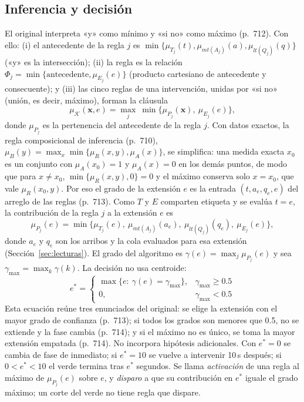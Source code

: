 \documentclass[journal]{IEEEtran}
\begin{document}
\subsection{Inferencia y decisión}
\label{ap:inferencia}
El original interpreta «y» como mínimo y «si no» como máximo (p.~712). Con ello: (i) el antecedente de la regla $j$ es $\min\{\mu_{T_j}(t),\mu_{mt(A_j)}(a),\mu_{lt(Q_j)}(q)\}$ («y» es la intersección); (ii) la regla es la relación $\Phi_j=\min\{\text{antecedente},\mu_{E_j}(e)\}$ (producto cartesiano de antecedente y consecuente); y (iii) las cinco reglas de una intervención, unidas por «si no» (unión, es decir, máximo), forman la cláusula
\begin{equation}
\mu_{\mathcal{K}}(\mathbf{x},e)=\max_{j}\ \min\{\mu_{P_j}(\mathbf{x}),\ \mu_{E_j}(e)\},
\label{eq:mamdani}
\end{equation}
donde $\mu_{P_j}$ es la pertenencia del antecedente de la regla $j$. Con datos exactos, la regla composicional de inferencia (p.~710), $\mu_B(y)=\max_x\min\{\mu_R(x,y),\mu_A(x)\}$, se simplifica: una medida exacta $x_0$ es un conjunto con $\mu_A(x_0)=1$ y $\mu_A(x)=0$ en los demás puntos, de modo que para $x\ne x_0$, $\min\{\mu_R(x,y),0\}=0$ y el máximo conserva solo $x=x_0$, que vale $\mu_R(x_0,y)$. Por eso el grado de la extensión $e$ es la entrada $(t,a_e,q_e,e)$ del arreglo de las reglas (p.~713). Como $T$ y $E$ comparten etiqueta y se evalúa $t=e$, la contribución de la regla $j$ a la extensión $e$ es
\begin{equation}
\mu_{P_j}(e)=\min\{\mu_{T_j}(e),\ \mu_{mt(A_j)}(a_e),\ \mu_{lt(Q_j)}(q_e),\ \mu_{E_j}(e)\},
\label{eq:premisa}
\end{equation}
donde $a_e$ y $q_e$ son los arribos y la cola evaluados para esa extensión (Sección~\ref{sec:lecturas}). El grado del algoritmo es $\gamma(e)=\max_j\mu_{P_j}(e)$ y sea $\gamma_{\max}=\max_k \gamma(k)$. La decisión no usa centroide:
\begin{equation}
e^*=\begin{cases}\max\{e:\ \gamma(e)=\gamma_{\max}\}, & \gamma_{\max}\ge 0.5\\ 0, & \gamma_{\max}<0.5\end{cases}
\label{eq:decision}
\end{equation}
Esta ecuación reúne tres enunciados del original: se elige la extensión con el mayor grado de confianza (p.~713); si todos los grados son menores que 0.5, no se extiende y la fase cambia (p.~714); y si el máximo no es único, se toma la mayor extensión empatada (p.~714). No incorpora hipótesis adicionales. Con $e^*=0$ se cambia de fase de inmediato; si $e^*=10$ se vuelve a intervenir 10\,s después; si $0<e^*<10$ el verde termina tras $e^*$ segundos. Se llama \emph{activación} de una regla al máximo de $\mu_{P_j}(e)$ sobre $e$, y \emph{disparo} a que su contribución en $e^*$ iguale el grado máximo; un corte del verde no tiene regla que dispare.
\end{document}
